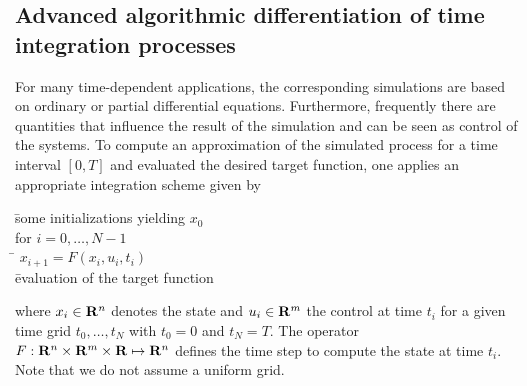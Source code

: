 \documentclass[11pt,twoside]{article}
\begin{document}
%
\subsection{Advanced algorithmic differentiation of time integration processes}
%
For many time-dependent applications, the corresponding simulations
are based on ordinary or partial differential equations.
Furthermore, frequently there are quantities that influence the
result of the simulation and can be seen as  control of the systems. 
To compute an approximation of the
simulated process for a time interval $[0,T]$ and evaluated the
desired target function, one applies an
appropriate integration scheme given by
\begin{tabbing}
\hspace{5mm} \= some initializations yielding $x_0$\\
\> for $i=0,\ldots, N-1$\\
\hspace{10mm}\= $x_{i+1} = F(x_i,u_i,t_i)$\\
\hspace{5mm} \= evaluation of the target function
\end{tabbing}
where $x_i\in {\bf R}^n$ denotes the state and $u_i\in {\bf R}^m$ the control at
time $t_i$ for a given time grid $t_0,\ldots,t_N$ with $t_0=0$ and
$t_N=T$. The operator $F : {\bf R}^n \times {\bf R}^m \times {\bf R} \mapsto {\bf R}^n$
defines the time step to compute the state at time $t_i$. Note that we
do not assume a uniform grid.
\end{document}
